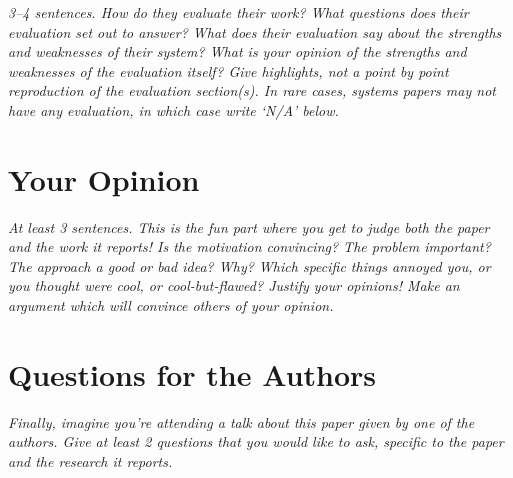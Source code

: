 \documentclass[11pt]{article}
\begin{document}
\textsl{3--4 sentences. How do they evaluate their work? What questions does their evaluation set out to answer? What does their evaluation say about the strengths and weaknesses of their system? What is your opinion of the strengths and weaknesses of the evaluation itself?  Give highlights, not a point by point reproduction of the evaluation section(s). In rare cases, systems papers may not have any evaluation, in which case write `N/A' below.}


\section*{Your Opinion}

\textsl{At least 3 sentences. This is the fun part where you get to judge both the paper and the work it reports! Is the motivation convincing? The problem important? The approach a good or bad idea?  Why? Which specific things annoyed you, or you thought were cool, or cool-but-flawed? Justify your opinions! Make an argument  which will convince others of your opinion.}


\section*{Questions for the Authors}

\textsl{Finally, imagine you're attending a talk about this paper given by one of the authors. Give at least 2 questions that you would like to ask, specific to the paper and the research it reports.}
\end{document}
